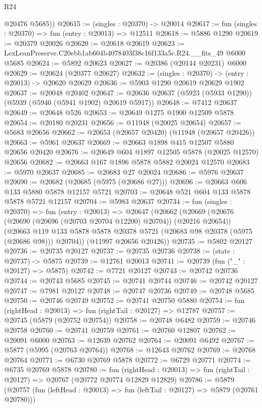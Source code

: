 \begin{lexlean}{R24}
\begin{coremodule}
        @20476
        @5685))
@20615 := (singles : @20370) -> @20014
@20617 := fun (singles : @20370) => fun (entry : @20013) => @12511
@20618 := @5886 @1290
@20619 := @20379 @20026
@20620 := @20618 @20619
@20623 := LexLeanPreserve.C20ebb1ab604b4078403f38c16f133a5c.R24.__fits_49 @6000 @5685
@20624 := @5892 @20623
@20627 := @20386 (@20144 @20231) @6000
@20629 := @20624 (@20377 @20627)
@20632 := (singles : @20370) -> (entry : @20013) -> @20620 @20629
@20636 := @5903 @1290 @20619 @20629 @1902
@20637 := @20048 @20402
@20647 := @20636 @20637 (@5923 (@5933 @1290)) (@5939 (@5940 (@5941 @1902) @20619 @5917))
@20648 := @7412 @20637
@20649 := @20648 @526
@20653 := @20649 @1275 @1900 @12509 @5878
@20654 := @20180 @20231
@20656 := @11948 (@20025 @20654)
@20657 := @5683 @20656
@20662 := @20653 (@20657 @20420) (@11948 (@20657 @20426))
@20663 := @5961 @20637
@20669 := @20663 @1898 @415 @12507 @5880 @20656 @20420
@20676 := @20649 @604 @1897 @12505 @5878 (@20025 @12570) @20656
@20682 := @20663 @167 @1896 @5878 @5882 @20024 @12570
@20683 := @5970 @20637
@20685 := @20683 @27 @20024
@20686 := @5976 @20637
@20690 := @20682 (@20685 (@5975 (@20686 @27)))
@20696 := @20663 @606 @133 @5880 @5878 @12157 @5721
@20703 := @20648 @521 @604 @133 @5878 @5878 @5721 @12157
@20704 := @5983 @20637
@20734 := fun (singles : @20370) =>
  fun (entry : @20013) =>
  @20647
    (@20662
      (@20669
        (@20676 (@20690 (@20696 (@20703 @20704 @12200) @20704)) (@20216 @20654))
        (@20663 @119 @133 @5878 @5878 @20378 @5721 (@20683 @98 @20378 (@5975 (@20686 @98))) @20704))
      (@11997 @20656 @20426))
@20735 := @5802 @20127
@20736 := @20735 @20127
@20737 := @20735 @20736
@20738 := (state : @20737) -> @5875
@20739 := @12761 @20013
@20741 := @20739 (fun ("_" : @20127) => @5875)
@20742 := @7721 @20127
@20743 := @20742 @20736
@20744 := @20743 @5685
@20745 := @20741 @20744
@20746 := @20742 @20127
@20747 := @7981 @20127
@20748 := @20747 @20736
@20749 := @20748 @5685
@20750 := @20746 @20749
@20752 := @20741 @20750 @5880
@20754 := fun (rightHead : @20013) => fun (rightTail : @20127) => @12787
@20757 := @20745 (@5879 (@20752 @20754))
@20758 := @20748 @6482
@20759 := @20746 @20758
@20760 := @20741 @20759
@20761 := @20760 @12807
@20762 := @20091 @6000
@20763 := @12639 @20762
@20764 := @20091 @6492
@20767 := @5877 (@5995 (@20763 @20764))
@20768 := @12643 @20762
@20769 := @20768 @20764
@20771 := @6730 @20769 @5878
@20772 := @6729 @20771
@20774 := @6735 @20769 @5878
@20780 := fun (rightHead : @20013) =>
  fun (rightTail : @20127) => @20767 (@20772 @20774 @12829 @12829)
@20786 := @5879
    (@20757 (fun (leftHead : @20013) => fun (leftTail : @20127) => @5879 (@20761 @20780)))

\end{coremodule}
\end{lexlean}
